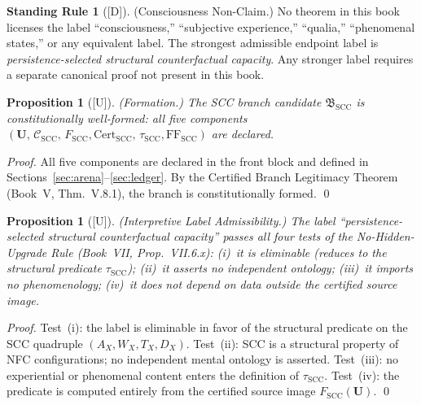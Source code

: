 \documentclass[12pt,oneside]{amsbook}
\theoremstyle{plain}
\newtheorem{proposition}[theorem]{Proposition}
\theoremstyle{definition}
\newtheorem{standingrule}[theorem]{Standing Rule}
\theoremstyle{remark}
\newcommand{\status}[1]{\textup{[#1]}}
\begin{document}
\begin{standingrule}[\status{D}]\label{sr:scc-no-consciousness}
\textup{(Consciousness Non-Claim.)} No theorem in this book
licenses the label ``consciousness,'' ``subjective experience,''
``qualia,'' ``phenomenal states,'' or any equivalent label.
The strongest admissible endpoint label is \emph{persistence-selected
structural counterfactual capacity}. Any stronger label requires
a separate canonical proof not present in this book.
\end{standingrule}

\begin{proposition}[\status{U}]\label{prop:scc-formation}
\textup{(Formation.)} The SCC branch candidate
$\mathfrak{B}_{\mathrm{SCC}}$
is constitutionally well-formed: all five components
$(\mathbf{U},\,\mathcal{C}_{\mathrm{SCC}},\,F_{\mathrm{SCC}},
\mathrm{Cert}_{\mathrm{SCC}},\,\tau_{\mathrm{SCC}},
\mathrm{FF}_{\mathrm{SCC}})$ are declared.
\end{proposition}

\begin{proof}
All five components are declared in the front block and defined
in Sections~\ref{sec:arena}--\ref{sec:ledger}. By the Certified
Branch Legitimacy Theorem (Book~V, Thm.~V.8.1), the branch is
constitutionally formed.
\qed
\end{proof}

\begin{proposition}[\status{U}]\label{prop:scc-label}
\textup{(Interpretive Label Admissibility.)} The label
``persistence-selected structural counterfactual capacity''
passes all four tests of the No-Hidden-Upgrade Rule (Book~VII,
Prop.~VII.6.x): (i)~it is eliminable (reduces to the structural
predicate $\tau_{\mathrm{SCC}}$); (ii)~it asserts no independent
ontology; (iii)~it imports no phenomenology; (iv)~it does not
depend on data outside the certified source image.
\end{proposition}

\begin{proof}
Test~(i): the label is eliminable in favor of the structural
predicate on the SCC quadruple $(A_X, W_X, T_X, D_X)$.
Test~(ii): SCC is a structural property of NFC configurations;
no independent mental ontology is asserted.
Test~(iii): no experiential or phenomenal content enters the
definition of $\tau_{\mathrm{SCC}}$.
Test~(iv): the predicate is computed entirely from the certified
source image $F_{\mathrm{SCC}}(\mathbf{U})$.
\qed
\end{proof}
\end{document}
